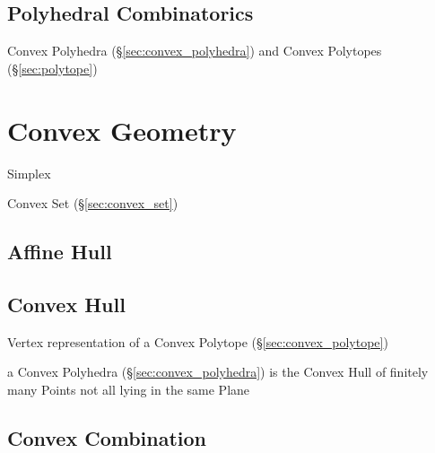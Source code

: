 \subsection{Polyhedral Combinatorics}\label{sec:polyhedral_combinatorics}

Convex Polyhedra (\S\ref{sec:convex_polyhedra}) and Convex Polytopes
(\S\ref{sec:polytope})



\section{Convex Geometry}\label{sec:convex_geometry}


Simplex

Convex Set (\S\ref{sec:convex_set})



\subsection{Affine Hull}\label{sec:affine_hull}

\subsection{Convex Hull}\label{sec:convex_hull}

Vertex representation of a Convex Polytope (\S\ref{sec:convex_polytope})

a Convex Polyhedra (\S\ref{sec:convex_polyhedra}) is the Convex Hull of
finitely many Points not all lying in the same Plane



\subsection{Convex Combination}\label{sec:convex_combination}

